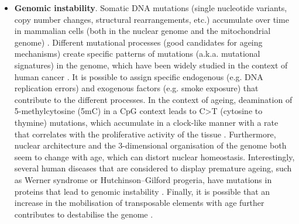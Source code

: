\begin{itemize}
	
	\item \textbf{Genomic instability}. Somatic DNA mutations (single nucleotide variants, copy number changes, structural rearrangements, etc.) accumulate over time in mammalian cells (both in the nuclear genome and the mitochondrial genome) \citep{Martincorena2018,Larsson2010}. Different mutational processes (good candidates for ageing mechanisms) create specific patterns of mutations (a.k.a. mutational signatures) in the genome, which have been widely studied in the context of human cancer \citep{Alexandrov2014}. It is possible to assign specific endogenous (e.g. DNA replication errors) and exogenous factors (e.g. smoke exposure) that contribute to the different processes. In the context of ageing, deamination of 5-methylcytosine (\acrshort{5mC}) in a \acrshort{CpG} context leads to C>T (cytosine to thymine) mutations, which accumulate in a clock-like manner with a rate that correlates with the proliferative activity of the tissue \citep{Alexandrov2015}. Furthermore, nuclear architecture and the 3-dimensional organisation of the genome both seem to change with age, which can distort nuclear homeostasis. Interestingly, several human diseases that are considered to display premature ageing, such as Werner syndrome or Hutchinson–Gilford progeria, have mutations in proteins that lead to genomic instability \citep{Oberdoerffer2007}. Finally, it is possible that an increase in the mobilisation of transposable elements with age further contributes to destabilise the genome \citep{Orr2016}.
	

\end{itemize}
